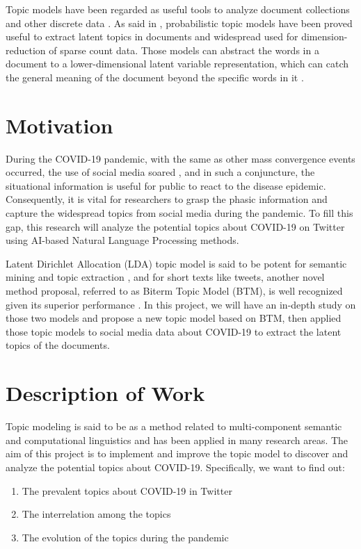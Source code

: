 Topic models have been regarded as useful tools to analyze document collections and other discrete data \cite{blei2007correlated}. As said in \cite{chemudugunta2006modeling}, probabilistic topic models have been proved useful to extract latent topics in documents and widespread used for dimension-reduction of sparse count data. Those models can abstract the words in a document to a lower-dimensional latent variable representation, which can catch the general meaning of the document beyond the specific words in it \cite{chemudugunta2006modeling}.


\section{Motivation}
During the COVID-19 pandemic, with the same as other mass convergence events occurred, the use of social media soared \cite{qazi2020geocov19}, and in such a conjuncture, the situational information is useful for public to react to the disease epidemic. Consequently, it is vital for researchers to grasp the phasic information and capture the widespread topics from social media during the pandemic. To fill this gap, this research will analyze the potential topics about COVID-19 on Twitter using AI-based Natural Language Processing methods. 

Latent Dirichlet Allocation (LDA) topic model is said to be potent for semantic mining and topic extraction \cite{jelodar2019natural}, and for short texts like tweets, another novel method proposal, referred to as Biterm Topic Model (BTM), is well recognized given its superior performance \cite{cheng2014btm}. In this project, we will have an in-depth study on those two models and propose a new topic model based on BTM, then applied those topic models to social media data about COVID-19 to extract the latent topics of the documents.


\section{Description of Work}

Topic modeling is said to be as a method related to multi-component semantic and computational linguistics and has been applied in many research areas. The aim of this project is to implement and improve the topic model to discover and analyze the potential topics about COVID-19. Specifically, we want to find out:
\begin{enumerate}
    \item The prevalent topics about COVID-19 in Twitter
    \item The interrelation among the topics
    \item The evolution of the topics during the pandemic
\end{enumerate}

